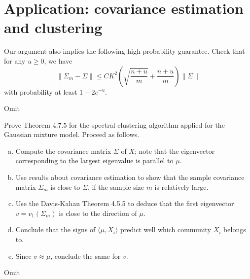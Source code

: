 \section{Application: covariance estimation and clustering}
\begin{problem*}[Exercise 4.7.3]\label{ex4.7.3}
	Our argument also implies the following high-probability guarantee. Check that for any \(u \geq 0\), we have
	\[
		\lVert \Sigma _m - \Sigma  \rVert
		\leq CK^2 \left( \sqrt{\frac{n + u}{m}} + \frac{n+u}{m} \right) \lVert \Sigma \rVert
	\]
	with probability at least \(1 - 2 e^{-u}\).
\end{problem*}
\begin{answer}
	Omit
\end{answer}

\begin{problem*}[Exercise 4.7.6]\label{ex4.7.6}
	Prove Theorem 4.7.5 for the spectral clustering algorithm applied for the Gaussian mixture model. Proceed as follows.
	\begin{enumerate}[(a)]
		\item Compute the covariance matrix \(\Sigma \) of \(X\); note that the eigenvector corresponding to the largest eigenvalue is parallel to \(\mu \).
		\item Use results about covariance estimation to show that the sample covariance matrix \(\Sigma _m\) is close to \(\Sigma \), if the sample size \(m\) is relatively large.
		\item Use the Davis-Kahan Theorem 4.5.5 to deduce that the first eigenvector \(v = v_1(\Sigma _m)\) is close to the direction of \(\mu \).
		\item Conclude that the signs of \(\langle \mu , X_i \rangle \) predict well which community \(X_i\) belongs to.
		\item Since \(v \approx \mu \), conclude the same for \(v\).
	\end{enumerate}
\end{problem*}
\begin{answer}
	Omit
\end{answer}